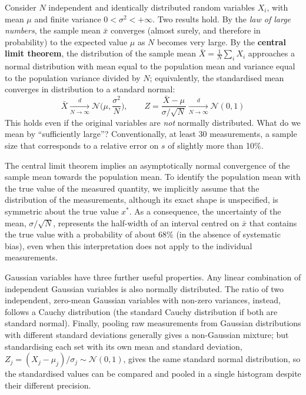 \documentclass[letterpaper,11pt,leqno]{book}
\begin{document}
Consider $N$ independent and identically distributed random variables $X_i$, with mean $\mu$ and finite variance $0 < \sigma^2 < +\infty$. Two results hold. By the \emph{law of large numbers}, the sample mean $\bar{x}$ converges (almost surely, and therefore in probability) to the expected value $\mu$ as $N$ becomes very large. By the \textbf{central limit theorem}, the distribution of the sample mean $\bar{X} = \frac{1}{N}\sum_i X_i$ approaches a normal distribution with mean equal to the population mean and variance equal to the population variance divided by $N$; equivalently, the standardised mean converges in distribution to a standard normal:
\begin{equation}
\boxed{\bar{X} \xrightarrow[N \to \infty]{d} \mathcal{N}\Big(\mu, \frac{\sigma^2}{N}\Big), \qquad Z = \frac{\bar{X} - \mu}{\sigma/\sqrt{N}} \xrightarrow[N \to \infty]{d} \mathcal{N}(0, 1)}
\label{eq:clt}
\end{equation}
This holds even if the original variables are \emph{not} normally distributed. What do we mean by ``sufficiently large''? Conventionally, at least 30 measurements, a sample size that corresponds to a relative error on $s$ of slightly more than 10\%.

The central limit theorem implies an asymptotically normal convergence of the sample mean towards the population mean. To identify the population mean with the true value of the measured quantity, we implicitly assume that the distribution of the measurements, although its exact shape is unspecified, is symmetric about the true value $x^*$. As a consequence, the uncertainty of the mean, $\sigma/\sqrt{N}$, represents the half-width of an interval centred on $\bar{x}$ that contains the true value with a probability of about 68\% (in the absence of systematic bias), even when this interpretation does not apply to the individual measurements.

Gaussian variables have three further useful properties. Any linear combination of independent Gaussian variables is also normally distributed. The ratio of two independent, zero-mean Gaussian variables with non-zero variances, instead, follows a Cauchy distribution (the standard Cauchy distribution if both are standard normal). Finally, pooling raw measurements from Gaussian distributions with different standard deviations generally gives a non-Gaussian mixture; but standardising each set with its own mean and standard deviation, $Z_j = (X_j - \mu_j)/\sigma_j \sim \mathcal{N}(0, 1)$, gives the same standard normal distribution, so the standardised values can be compared and pooled in a single histogram despite their different precision.
\end{document}
